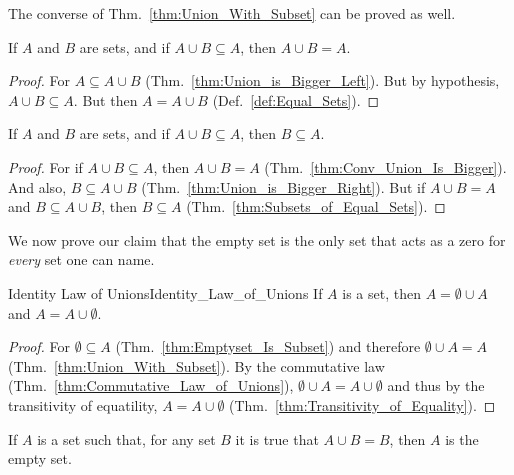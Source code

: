         The converse of Thm.~\ref{thm:Union_With_Subset} can be proved as well.
        \begin{theorem}
            \label{thm:Conv_Union_Is_Bigger}%
            If $A$ and $B$ are sets, and if $A\cup{B}\subseteq{A}$, then
            $A\cup{B}=A$.
        \end{theorem}
        \begin{proof}
            For $A\subseteq{A}\cup{B}$ (Thm.~\ref{thm:Union_is_Bigger_Left}).
            But by hypothesis, $A\cup{B}\subseteq{A}$. But then $A=A\cup{B}$
            (Def.~\ref{def:Equal_Sets}).
        \end{proof}
        \begin{theorem}
            \label{thm:Union_is_Equal}%
            If $A$ and $B$ are sets, and if $A\cup{B}\subseteq{A}$, then
            $B\subseteq{A}$.
        \end{theorem}
        \begin{proof}
            For if $A\cup{B}\subseteq{A}$, then $A\cup{B}=A$
            (Thm.~\ref{thm:Conv_Union_Is_Bigger}). And also,
            $B\subseteq{A}\cup{B}$ (Thm.~\ref{thm:Union_is_Bigger_Right}). But
            if $A\cup{B}=A$ and $B\subseteq{A}\cup{B}$, then $B\subseteq{A}$
            (Thm.~\ref{thm:Subsets_of_Equal_Sets}).
        \end{proof}
        We now prove our claim that the empty set is the only set that acts as a
        zero for \textit{every} set one can name.
        \begin{ltheorem}{Identity Law of Unions}{Identity_Law_of_Unions}
            If $A$ is a set, then $A=\emptyset\cup{A}$ and $A=A\cup\emptyset$.
        \end{ltheorem}
        \begin{proof}
            For $\emptyset\subseteq{A}$ (Thm.~\ref{thm:Emptyset_Is_Subset}) and
            therefore $\emptyset\cup{A}=A$ (Thm.~\ref{thm:Union_With_Subset}).
            By the commutative law (Thm.~\ref{thm:Commutative_Law_of_Unions}),
            $\emptyset\cup{A}=A\cup\emptyset$ and thus by the transitivity of
            equatility, $A=A\cup\emptyset$
            (Thm.~\ref{thm:Transitivity_of_Equality}).
        \end{proof}
        \begin{theorem}
            \label{thm:Empty_Set_Is_Zero_for_Unions}%
            If $A$ is a set such that, for any set $B$ it is true that
            $A\cup{B}=B$, then $A$ is the empty set.
        \end{theorem}

